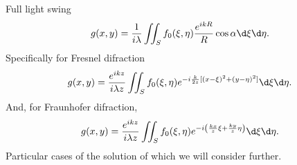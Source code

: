 Full light swing
\begin{equation}
    g(x, y) = \frac{1}{i\lambda} \iint_S f_0 (\xi, \eta) \frac{e^{ikR}}{R} \cos \alpha \d  \xi \d \eta.
\end{equation}
Specifically for Fresnel difraction
\begin{equation}
    g(x, y) = 
    \frac{e^{ikz}}{i \lambda z} \iint_S
    f_0(\xi, \eta) e^{
    - i\frac{k}{2z} [(x-\xi)^2 + (y-\eta)^2]} \d \xi \d \eta.
\end{equation}
And, for Fraunhofer difraction,
\begin{equation}
    g(x, y) = 
    \frac{e^{ikz}}{i \lambda z}
    \iint_S
    f_0(\xi, \eta) e^{-i\left(
        \frac{kx}{z} \xi + \frac{ky}{z} \eta
    \right)} \d \xi \d \eta.
\end{equation}
Particular cases of the solution of which we will consider further.